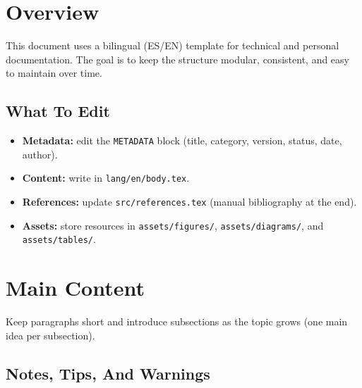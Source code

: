 
\section{Overview}
\vspace{2mm}

This document uses a bilingual (ES/EN) template for technical and personal documentation. The goal is to keep the structure modular, consistent, and easy to maintain over time.

\vspace{2mm}


\subsection{What To Edit}
\vspace{2mm}

\begin{itemize}
  \item \textbf{Metadata:} edit the \texttt{METADATA} block (title, category, version, status, date, author).
  \item \textbf{Content:} write in \texttt{lang/en/body.tex}.
  \item \textbf{References:} update \texttt{src/references.tex} (manual bibliography at the end).
  \item \textbf{Assets:} store resources in \texttt{assets/figures/}, \texttt{assets/diagrams/}, and \texttt{assets/tables/}.
\end{itemize}

\vspace{2mm}


\section{Main Content}
\vspace{2mm}

Keep paragraphs short and introduce subsections as the topic grows (one main idea per subsection).

\vspace{2mm}


\subsection{Notes, Tips, And Warnings}
\vspace{2mm}

